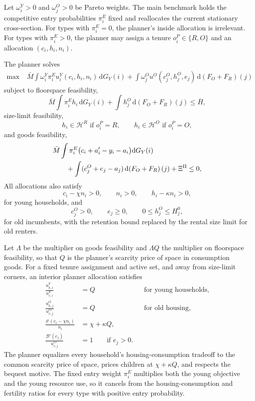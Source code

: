 \documentclass[11pt]{article}
\newcommand{\dd}{\mathrm d}
\newcommand{\1}{\mathbf 1}
\newcommand{\HH}{\mathcal H}
\begin{document}
Let $\omega_i^Y>0$ and $\omega_j^O>0$ be Pareto weights. The main benchmark holds the competitive entry probabilities $\pi_i^E$ fixed and reallocates the current stationary cross-section. For types with $\pi_i^E=0$, the planner's inside allocation is irrelevant. For types with $\pi_i^E>0$, the planner may assign a tenure $o_i^P\in\{R,O\}$ and an allocation $(c_i,h_i,n_i)$.

The planner solves
\begin{align}
\max\; &
\bar M\int
\omega_i^Y\pi_i^E u_i^Y(c_i,h_i,n_i)\,\dd G_Y(i)
+
\int
\omega_j^O u^O(c_j^O,h_j^O,e_j)\,\dd\!\left(F_O+F_R\right)(j)
\label{eq:compact_planner_problem}
\end{align}
subject to floorspace feasibility,
\[
\bar M\int \pi_i^E h_i\,\dd G_Y(i)
+\int h_j^O\,\dd\!\left(F_O+F_R\right)(j)\le \bar H,
\]
size-limit feasibility,
\[
h_i\in\HH^R\text{ if }o_i^P=R,
\qquad
h_i\in\HH^O\text{ if }o_i^P=O,
\]
and goods feasibility,
\begin{align*}
&\bar M\int
\pi_i^E
\big(c_i+a_i'-y_i-a_i\big)\dd G_Y(i)
\notag\\
&\qquad
+
\int(c_j^O+e_j-a_j)\,\dd\!\left(F_O+F_R\right)(j)
+\Xi^\Pi
\le0,
\end{align*}
All allocations also satisfy
\[
c_i-\chi n_i>0,\qquad n_i>0,\qquad h_i-\kappa n_i>0,
\]
for young households, and
\[
c_j^O>0,\qquad e_j\ge0,\qquad 0\le h_j^O\le H_j^0,
\]
for old incumbents, with the retention bound replaced by the rental size limit for old renters.

Let $\Lambda$ be the multiplier on goods feasibility and $\Lambda Q$ the multiplier on floorspace feasibility, so that $Q$ is the planner's scarcity price of space in consumption goods. For a fixed tenure assignment and active set, and away from size-limit corners, an interior planner allocation satisfies
\begin{align*}
\frac{u^Y_{h,i}}{u^Y_{c,i}}&=Q
&&\text{for young households},
\\
\frac{u^O_{h,j}}{u^O_{c,j}}&=Q
&&\text{for old housing},
\\
\frac{\vartheta\,(c_i-\chi n_i)}{n_i}&=\chi+\kappa Q,
\\
\frac{\mathcal B'(e_j)}{u^O_{c,j}}&=1
\qquad \text{if }e_j>0.
\end{align*}
The planner equalizes every household's housing-consumption tradeoff to the common scarcity price of space, prices children at $\chi+\kappa Q$, and respects the bequest motive.
The fixed entry weight $\pi_i^E$ multiplies both the young objective and the young resource use, so it cancels from the housing-consumption and fertility ratios for every type with positive entry probability.
\end{document}
